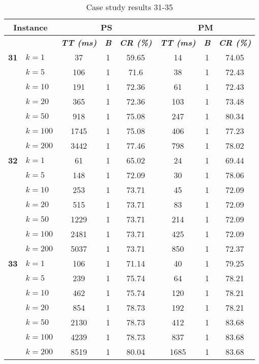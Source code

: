     \begin{table}[htbp]
    \caption{Case study results 31-35}
    \centering
    \begin{tabular}{|l|l|c|c|c|c|c|c|}
    \hline
    \multicolumn{ 2}{|c|}{\textbf{Instance}} & \multicolumn{ 3}{c|}{\textbf{PS}} & \multicolumn{ 3}{c|}{\textbf{PM}} \\ \hline
    \multicolumn{ 2}{|l|}{} & \textbf{\textit{TT (ms)}} & \textbf{\textit{B}} & \textbf{\textit{CR (\%)}} & \textbf{\textit{TT (ms)}} & \textbf{\textit{B}} & \textbf{\textit{CR (\%)}} \\ \hline
    \multicolumn{1}{|r|}{\textbf{31}} & $k=1$ & 37 & 1 & 59.65 & 14 & 1 & 74.05 \\ 
     & $k=5$ & 106 & 1 & 71.6 & 38 & 1 & 72.43 \\ 
     & $k=10$ & 191 & 1 & 72.36 & 61 & 1 & 72.43 \\ 
     & $k=20$ & 365 & 1 & 72.36 & 103 & 1 & 73.48 \\ 
     & $k=50$ & 918 & 1 & 75.08 & 247 & 1 & 80.34 \\ 
     & $k=100$ & 1745 & 1 & 75.08 & 406 & 1 & 77.23 \\ 
     & $k=200$ & 3442 & 1 & 77.46 & 798 & 1 & 78.02 \\ \hline
    \multicolumn{1}{|r|}{\textbf{32}} & $k=1$ & 61 & 1 & 65.02 & 24 & 1 & 69.44 \\ 
     & $k=5$ & 148 & 1 & 72.09 & 30 & 1 & 78.06 \\ 
     & $k=10$ & 253 & 1 & 73.71 & 45 & 1 & 72.09 \\ 
     & $k=20$ & 515 & 1 & 73.71 & 83 & 1 & 72.09 \\ 
     & $k=50$ & 1229 & 1 & 73.71 & 214 & 1 & 72.09 \\ 
     & $k=100$ & 2481 & 1 & 73.71 & 425 & 1 & 72.09 \\ 
     & $k=200$ & 5037 & 1 & 73.71 & 850 & 1 & 72.37 \\ \hline
    \multicolumn{1}{|r|}{\textbf{33}} & $k=1$ & 106 & 1 & 71.14 & 40 & 1 & 79.25 \\ 
     & $k=5$ & 239 & 1 & 75.74 & 64 & 1 & 78.21 \\ 
     & $k=10$ & 462 & 1 & 75.74 & 120 & 1 & 78.21 \\ 
     & $k=20$ & 854 & 1 & 78.73 & 192 & 1 & 78.21 \\ 
     & $k=50$ & 2130 & 1 & 78.73 & 412 & 1 & 83.68 \\ 
     & $k=100$ & 4239 & 1 & 78.73 & 837 & 1 & 83.68 \\ 
     & $k=200$ & 8519 & 1 & 80.04 & 1685 & 1 & 83.68 \\ \hline

\end{tabular}
\end{table}
